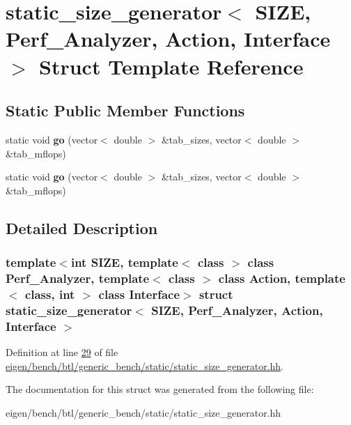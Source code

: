\hypertarget{structstatic__size__generator}{}\section{static\+\_\+size\+\_\+generator$<$ S\+I\+ZE, Perf\+\_\+\+Analyzer, Action, Interface $>$ Struct Template Reference}
\label{structstatic__size__generator}
\subsection*{Static Public Member Functions}
\begin{DoxyCompactItemize}
\item 
\mbox{\label{structstatic__size__generator_a320325ca497fcbb648da06fe427f4214}} 
static void {\bfseries go} (vector$<$ double $>$ \&tab\+\_\+sizes, vector$<$ double $>$ \&tab\+\_\+mflops)
\item 
\mbox{\label{structstatic__size__generator_a320325ca497fcbb648da06fe427f4214}} 
static void {\bfseries go} (vector$<$ double $>$ \&tab\+\_\+sizes, vector$<$ double $>$ \&tab\+\_\+mflops)
\end{DoxyCompactItemize}


\subsection{Detailed Description}
\subsubsection*{template$<$int S\+I\+ZE, template$<$ class $>$ class Perf\+\_\+\+Analyzer, template$<$ class $>$ class Action, template$<$ class, int $>$ class Interface$>$\newline
struct static\+\_\+size\+\_\+generator$<$ S\+I\+Z\+E, Perf\+\_\+\+Analyzer, Action, Interface $>$}



Definition at line \hyperlink{eigen_2bench_2btl_2generic__bench_2static_2static__size__generator_8hh_source_l00029}{29} of file \hyperlink{eigen_2bench_2btl_2generic__bench_2static_2static__size__generator_8hh_source}{eigen/bench/btl/generic\+\_\+bench/static/static\+\_\+size\+\_\+generator.\+hh}.



The documentation for this struct was generated from the following file\+:\begin{DoxyCompactItemize}
\item 
eigen/bench/btl/generic\+\_\+bench/static/static\+\_\+size\+\_\+generator.\+hh\end{DoxyCompactItemize}
